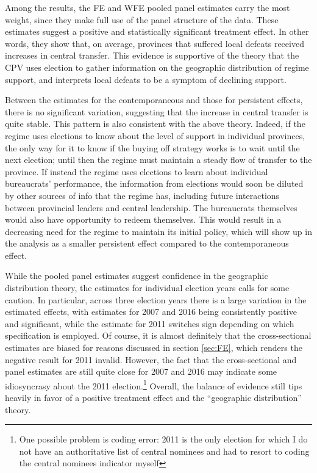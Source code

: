 \documentclass[12pt]{article}\usepackage[]{graphicx}\usepackage[]{color}
\newcommand{\1}{\mathbbm{1}}
\begin{document}
Among the results, the FE and WFE pooled panel estimates carry the most weight, since they make full use of the panel structure of the data. These estimates suggest a positive and statistically significant treatment effect. In other words, they show that, on average, provinces that suffered local defeats received increases in central transfer. This evidence is supportive of the theory that the CPV uses election to gather information on the geographic distribution of regime support, and interprets local defeats to be a symptom of declining support.

Between the estimates for the contemporaneous and those for persistent effects, there is no significant variation, suggesting that the increase in central transfer is quite stable. This pattern is also consistent with the above theory. Indeed, if the regime uses elections to know about the level of support in individual provinces, the only way for it to know if the buying off strategy works is to wait until the next election; until then the regime must maintain a steady flow of transfer to the province.  If instead the regime uses elections to learn about individual bureaucrats' performance, the information from elections would soon be diluted by other sources of info that the regime has, including future interactions between provincial leaders and central leadership. The bureaucrats themselves would also have opportunity to redeem themselves. This would result in a decreasing need for the regime to maintain its initial policy, which will show up in the analysis as a smaller persistent effect compared to the contemporaneous effect.

While the pooled panel estimates suggest confidence in the geographic distribution theory, the estimates for individual election years calls for some caution. In particular, across three election years there is a large variation in the estimated effects, with estimates for 2007 and 2016 being consistently positive and significant, while the estimate for 2011 switches sign depending on which specification is employed. Of course, it is almost definitely that the cross-sectional estimates are biased for reasons discussed in section \ref{sec:FE}, which renders the negative result for 2011 invalid. However, the fact that the cross-sectional and panel estimates are still quite close for 2007 and 2016 may indicate some idiosyncrasy about the 2011 election.\footnote{One possible problem is coding error: 2011 is the only election for which I do not have an authoritative list of central nominees and had to resort to coding the central nominees indicator myself} Overall, the balance of evidence still tips heavily in favor of a positive treatment effect and the ``geographic distribution'' theory.
\end{document}
